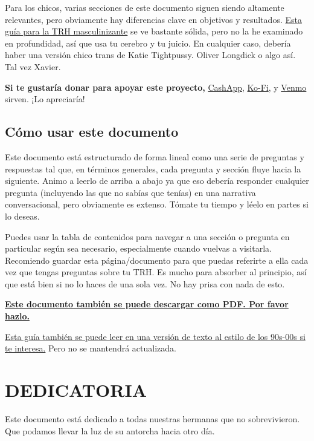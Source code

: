 \documentclass{article}
\begin{document}
Para los chicos, varias secciones de este documento siguen siendo altamente relevantes, pero obviamente hay diferencias clave en objetivos y resultados. \href{https://mega.nz/folder/cfwSmBbY#ify6kaueB8SdDD1v12t2Dw}{Esta guía para la TRH masculinizante} se ve bastante sólida, pero no la he examinado en profundidad, así que usa tu cerebro y tu juicio. En cualquier caso, debería haber una versión chico trans de Katie Tightpussy. Oliver Longdick o algo así. Tal vez Xavier.

\textbf{Si te gustaría donar para apoyar este proyecto,} \href{https://cash.app/Katitties}{CashApp}, \href{https://ko-fi.com/katitties}{Ko-Fi}, y \href{https://account.venmo.com/u/katitties}{Venmo} sirven. ¡Lo apreciaría!

\subsection*{Cómo usar este documento}

Este documento está estructurado de forma lineal como una serie de preguntas y respuestas tal que, en términos generales, cada pregunta y sección fluye hacia la siguiente. Animo a leerlo de arriba a abajo ya que eso debería responder cualquier pregunta (incluyendo las que no sabías que tenías) en una narrativa conversacional, pero obviamente es extenso. Tómate tu tiempo y léelo en partes si lo deseas.

Puedes usar la tabla de contenidos para navegar a una sección o pregunta en particular según sea necesario, especialmente cuando vuelvas a visitarla. Recomiendo guardar esta página/documento para que puedas referirte a ella cada vez que tengas preguntas sobre tu TRH. Es mucho para absorber al principio, así que está bien si no lo haces de una sola vez. No hay prisa con nada de esto.

\noindent\textbf{\href{PDF_LINK}{Este documento también se puede descargar como PDF. Por favor hazlo.}}

\noindent\href{https://pghrt.diy/pghrtgretchensversion.txt}{Esta guía también se puede leer en una versión de texto al estilo de los 90s-00s si te interesa.} Pero no se mantendrá actualizada.



\section*{DEDICATORIA}

Este documento está dedicado a todas nuestras hermanas que no sobrevivieron. Que podamos llevar la luz de su antorcha hacia otro día.
\end{document}
